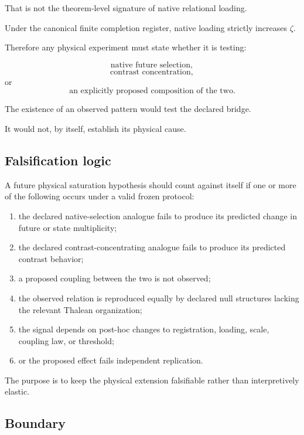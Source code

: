 That is not the theorem-level signature of native relational loading.

Under the canonical finite completion register, native loading
strictly increases \(\zeta\).

Therefore any physical experiment must state whether it is testing:

\[
\text{native future selection},
\]
\[
\text{contrast concentration},
\]
or
\[
\text{an explicitly proposed composition of the two}.
\]

The existence of an observed pattern would test the declared bridge.

It would not, by itself, establish its physical cause.

\subsection{Falsification logic}


A future physical saturation hypothesis should count against itself if
one or more of the following occurs under a valid frozen protocol:

\begin{enumerate}[label=(\roman*)]

\item the declared native-selection analogue fails to produce its
predicted change in future or state multiplicity;

\item the declared contrast-concentrating analogue fails to produce
its predicted contrast behavior;

\item a proposed coupling between the two is not observed;

\item the observed relation is reproduced equally by declared null
structures lacking the relevant Thalean organization;

\item the signal depends on post-hoc changes to registration, loading,
scale, coupling law, or threshold;

\item or the proposed effect fails independent replication.

\end{enumerate}

The purpose is to keep the physical extension falsifiable rather than
interpretively elastic.

\subsection{Boundary}


